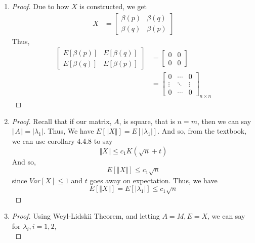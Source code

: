 \documentclass[11pt]{article}
\begin{document}
\begin{enumerate}
	\item
	\begin{proof}
	Due to how $X$ is constructed, we get
	\begin{align*}
		X &=
		\left[
		\begin{array}{c|c}
			\beta(p) & \beta(q) \\
			\hline
			\beta(q) & \beta(p)
		\end{array}
		\right]
	\end{align*}
	Thus,
	\begin{align*}
		\left[
		\begin{array}{c|c}
			E[\beta(p)] & E[\beta(q)] \\
			\hline
			E[\beta(q)] & E[\beta(p)]
		\end{array}
		\right]
	&= \left[
		\begin{array}{c|c}
			0 & 0 \\
			\hline
			0 & 0
		\end{array}
		\right]\\
	&=
	\begin{bmatrix}
	0 & \cdots & 0 \\
	\vdots & \ddots & \vdots \\
	0 & \cdots & 0
	\end{bmatrix}_{n \times n}
	\end{align*}
	\end{proof}
	\item
	\begin{proof} Recall that if our matrix, $A$, is square, that is $n = m$, then we can say
	$\Vert A \Vert = \vert \lambda_1 \vert$. Thus, We have $E[\Vert X \Vert] = E[\vert \lambda_1 \vert].$ And so, from the textbook,
	we can use corollary 4.4.8 to say
	\begin{equation}
		\Vert X \Vert \le c_1K(\sqrt{n} + t)
	\end{equation}
	And so,
	\begin{equation}
		E[\Vert X \Vert] \le c_1 \sqrt{n}
	\end{equation}
	since $Var[X] \le 1$ and $t$ goes away on expectation. Thus, we have
		\begin{equation}
		E[\Vert X \Vert] = E[\vert \lambda_1 \vert] \le c_1 \sqrt{n}
	\end{equation}
	\end{proof}
	\item
	\begin{proof}
	Using Weyl-Lidskii Theorem, and letting $A = M, E = X$, we can say for $\lambda_i, i = 1,2$,
	\begin{equation}

\end{equation}
\end{proof}
\end{enumerate}
\end{document}
